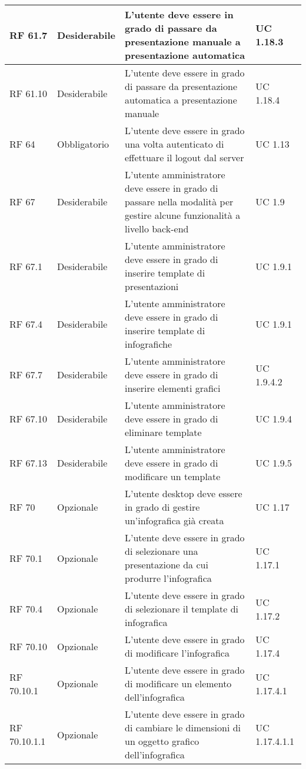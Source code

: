 {\begin{longtable} [c]{| p{2.5cm} | p{2.5cm} | p{6cm} |p{2.5cm}|}
			\hline
			RF 61.7 & Desiderabile & L'utente deve essere in grado di passare da presentazione manuale a presentazione automatica & UC 1.18.3\\
			\hline
			RF 61.10 & Desiderabile & L'utente deve essere in grado di passare da presentazione automatica a presentazione manuale & UC 1.18.4\\
			\hline
			RF 64 & Obbligatorio & L'utente deve essere in grado una volta autenticato di effettuare il logout\ped{g} dal server\ped{g} & UC 1.13\\
			\hline
			RF 67 & Desiderabile & L'utente amministratore deve essere in grado di passare nella modalità per gestire alcune funzionalità a livello back-end & UC 1.9\\
			\hline
			RF 67.1 & Desiderabile & L'utente amministratore deve essere in grado di inserire template\ped{g} di presentazioni & UC 1.9.1\\
			\hline
			RF 67.4 & Desiderabile & L'utente amministratore deve essere in grado di inserire template\ped{g} di infografiche\ped{g} & UC 1.9.1\\
			\hline
			RF 67.7 & Desiderabile & L'utente amministratore deve essere in grado di inserire elementi grafici & UC 1.9.4.2\\
			\hline
			RF 67.10 & Desiderabile & L'utente amministratore deve essere in grado di eliminare template\ped{g} & UC 1.9.4\\
			\hline
			RF 67.13 & Desiderabile & L'utente amministratore deve essere in grado di modificare un template\ped{g} & UC 1.9.5\\
			\hline
			RF 70 & Opzionale & L'utente desktop\ped{g} deve essere in grado di gestire un'infografica\ped{g} già creata & UC 1.17\\
			\hline
			RF 70.1 & Opzionale & L'utente deve essere in grado di selezionare una presentazione da cui produrre l'infografica\ped{g} & UC 1.17.1\\
			\hline
			RF 70.4 & Opzionale & L'utente deve essere in grado di selezionare il template\ped{g} di infografica\ped{g} & UC 1.17.2\\
			\hline
			RF 70.10 & Opzionale & L'utente deve essere in grado di modificare l'infografica\ped{g} & UC 1.17.4\\
			\hline			
			RF 70.10.1 & Opzionale & L'utente deve essere in grado di modificare un elemento dell'infografica\ped{g} & UC 1.17.4.1\\
			\hline
			RF 70.10.1.1 & Opzionale & L'utente deve essere in grado di cambiare le dimensioni di un oggetto grafico dell'infografica\ped{g} & UC 1.17.4.1.1\\

\end{longtable}}
